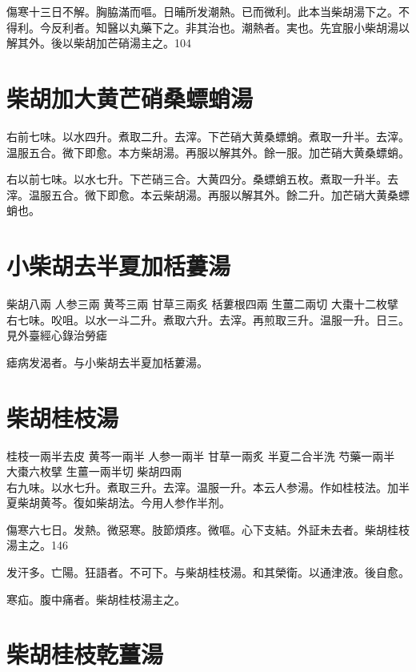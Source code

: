 傷寒十三日不解。胸脇滿而嘔。日晡所发潮熱{\khaai 。已}而微利。此本当柴胡湯下之。不得利。今反利者。知醫以丸藥下之。非其治也。潮熱者。実也。先宜服小柴胡湯以解其外。後以柴胡加芒硝湯主之。104

\section{柴胡加大黄芒硝桑螵蛸湯}

右前七味。以水四升。煮取二升。去滓。下芒硝大黄桑螵蛸。煮取一升半。去滓。温服五合。微下即愈。本方柴胡湯。再服以解其外。餘一服。加芒硝大黄桑螵蛸。{\yuhan}

右以前七味。以水七升。下芒硝三合。大黄四分。桑螵蛸五枚。煮取一升半。去滓。温服五合。微下即愈。本云柴胡湯。再服以解其外。餘二升。加芒硝大黄桑螵蛸也。{\yifang}

\section{小柴胡去半夏加栝蔞湯}

柴胡{\scriptsize 八兩} 人参{\scriptsize 三兩} 黄芩{\scriptsize 三兩} 甘草{\scriptsize 三兩炙} 栝蔞根{\scriptsize 四兩} 生薑{\scriptsize 二兩切} 大棗{\scriptsize 十二枚擘}\\
右七味。㕮咀。以水一斗二升。煮取六升。去滓。再煎取三升。温服一升。日三。{\scriptsize 見外臺經心錄治勞瘧}

瘧病发渴者。与小柴胡去半夏加栝蔞湯。

\section{柴胡桂枝湯}

桂枝{\scriptsize 一兩半去皮} 黄芩{\scriptsize 一兩半} 人参{\scriptsize 一兩半} 甘草{\scriptsize 一兩炙} 半夏{\scriptsize 二合半洗} 芍藥{\scriptsize 一兩半} 大棗{\scriptsize 六枚擘} 生薑{\scriptsize 一兩半切} 柴胡{\scriptsize 四兩}\\
右九味。以水七升。煮取三升。去滓。温服一升。本云人参湯。作如桂枝法。加半夏柴胡黄芩。復如柴胡法。今用人参作半剂。

傷寒六七日。发熱。微惡寒。肢節煩疼。微嘔。心下支結。外証未去者。柴胡桂枝湯主之。146

发汗多。亡陽。狂語者。不可下。与柴胡桂枝湯。和其榮衛。以通津液。後自愈。

寒疝。腹中痛者。柴胡桂枝湯主之。

\section{柴胡桂枝乾薑湯}


